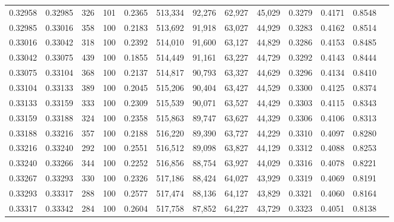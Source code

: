 \begin{tabular}{rrrrrrrrrrrrr}
0.32958 & 0.32985 &   326 & 101 &                                     0.2365 & 513,334 &  92,276 &  62,927 &  45,029 & 0.3279 & 0.4171 & 0.8548 \\
0.32985 & 0.33016 &   358 & 100 &                                     0.2183 & 513,692 &  91,918 &  63,027 &  44,929 & 0.3283 & 0.4162 & 0.8514 \\
0.33016 & 0.33042 &   318 & 100 &                                     0.2392 & 514,010 &  91,600 &  63,127 &  44,829 & 0.3286 & 0.4153 & 0.8485 \\
0.33042 & 0.33075 &   439 & 100 &                                     0.1855 & 514,449 &  91,161 &  63,227 &  44,729 & 0.3292 & 0.4143 & 0.8444 \\
0.33075 & 0.33104 &   368 & 100 &                                     0.2137 & 514,817 &  90,793 &  63,327 &  44,629 & 0.3296 & 0.4134 & 0.8410 \\
0.33104 & 0.33133 &   389 & 100 &                                     0.2045 & 515,206 &  90,404 &  63,427 &  44,529 & 0.3300 & 0.4125 & 0.8374 \\
0.33133 & 0.33159 &   333 & 100 &                                     0.2309 & 515,539 &  90,071 &  63,527 &  44,429 & 0.3303 & 0.4115 & 0.8343 \\
0.33159 & 0.33188 &   324 & 100 &                                     0.2358 & 515,863 &  89,747 &  63,627 &  44,329 & 0.3306 & 0.4106 & 0.8313 \\
0.33188 & 0.33216 &   357 & 100 &                                     0.2188 & 516,220 &  89,390 &  63,727 &  44,229 & 0.3310 & 0.4097 & 0.8280 \\
0.33216 & 0.33240 &   292 & 100 &                                     0.2551 & 516,512 &  89,098 &  63,827 &  44,129 & 0.3312 & 0.4088 & 0.8253 \\
0.33240 & 0.33266 &   344 & 100 &                                     0.2252 & 516,856 &  88,754 &  63,927 &  44,029 & 0.3316 & 0.4078 & 0.8221 \\
0.33267 & 0.33293 &   330 & 100 &                                     0.2326 & 517,186 &  88,424 &  64,027 &  43,929 & 0.3319 & 0.4069 & 0.8191 \\
0.33293 & 0.33317 &   288 & 100 &                                     0.2577 & 517,474 &  88,136 &  64,127 &  43,829 & 0.3321 & 0.4060 & 0.8164 \\
0.33317 & 0.33342 &   284 & 100 &                                     0.2604 & 517,758 &  87,852 &  64,227 &  43,729 & 0.3323 & 0.4051 & 0.8138 \\

\end{tabular}
